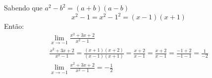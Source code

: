 \documentclass{jhwhw}
\begin{document}
Sabendo que $a^2 - b^2 = (a+b)(a-b)$
\[x^2 - 1 = x^2 - 1^2 = (x-1)(x+1)\]
Então:
\begin{multline*}
    \lim_{x \to -1} \frac{x^2 + 3x + 2}{x^2 - 1} \\ \frac{x^2 + 3x + 2}{x^2 - 1} = \frac{(x+1)(x+2)}{(x-1)(x+1)} = \frac{x+2}{x-1}
    = \frac{x+2}{x-1} = \frac{-1+2}{-1-1} = \frac{1}{-2} \\
    \boxed{\lim_{x \to -1} \frac{x^2 + 3x + 2}{x^2 - 1} = -\frac{1}{2}}
\end{multline*}
\end{document}
